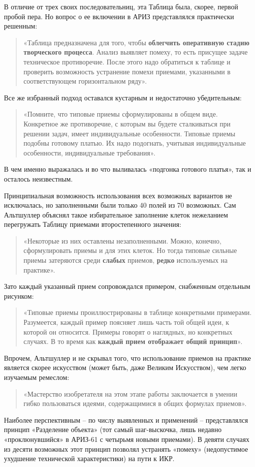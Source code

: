 \documentclass[11pt,a4paper]{article}
\begin{document}
В отличие от трех своих последовательниц, эта Таблица была, скорее, первой
пробой пера. Но вопрос о ее включении в АРИЗ представлялся практически
решенным:
\begin{quote}
  «Таблица предназначена для того, чтобы \textbf{облегчить оперативную стадию
    творческого процесса}. Анализ выявляет помеху, то есть присущее задаче
  техническое противоречие. После этого надо обратиться к таблице и проверить
  возможность устранение помехи приемами, указанными в соответствующем
  горизонтальном ряду». \cite{Altshuller1964}
\end{quote}
Все же избранный подход оставался кустарным и недостаточно убедительным:
\begin{quote}  
  «Помните, что типовые приемы сформулированы в общем виде. Конкретное же
  противоречие, с которым вы будете сталкиваться при решении задач, имеет
  индивидуальные особенности. Типовые приемы подобны готовому платью. Их надо
  подогнать, учитывая индивидуальные особенности, индивидуальные требования».
\end{quote}
В чем именно выражалась и во что выливалась «подгонка готового платья», так и
осталось неизвестным.

Принципиальная возможность использования всех возможных вариантов не
исключалась, но заполненными были только 40 полей из 70 возможных. Сам
Альтшуллер объяснял такое избирательное заполнение клеток нежеланием
перегружать Таблицу приемами второстепенного значения:
\begin{quote}  
  «Некоторые из них оставлены незаполненными. Можно, конечно, сформулировать
  приемы и для этих клеток. Но тогда типовые сильные приемы затеряются среди
  \textbf{слабых} приемов, \textbf{редко} используемых на практике».
\end{quote}
Зато каждый указанный прием сопровождался примером, снабженным отдельным
рисунком:
\begin{quote}  
  «Типовые приемы проиллюстрированы в таблице конкретными примерами.
  Разумеется, каждый пример поясняет лишь часть той общей идеи, к которой он
  относится. Примеры говорят о наглядных, но конкретных случаях. В то время
  как \textbf{каждый прием отображает общий принцип}».
\end{quote}
Впрочем, Альтшуллер и не скрывал того, что использование приемов на практике
является скорее искусством (может быть, даже Великим Искусством), чем легко
изучаемым ремеслом:
\begin{quote}  
  «Мастерство изобретателя на этом этапе работы заключается в умении гибко
  пользоваться идеями, содержащимися в общих формулах приемов».
\end{quote}
Наиболее перспективным -- по числу выявленных и применений -- представлялся
принцип «Разделение объекта» (тот самый шаг-выскочка, лишь недавно
«проклюнувшийся» в АРИЗ-61 с четырьмя новыми приемами). В девяти случаях из
десяти возможных этот принцип позволял устранять «помеху» (недопустимое
ухудшение технической характеристики) на пути к ИКР.
\end{document}
